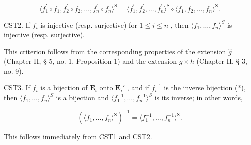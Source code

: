 \[
\langle f _ {1} ^ {\prime} \circ f _ {1}, f _ {2} ^ {\prime} \circ f _ {2}, \dots , f _ {n} ^ {\prime} \circ f _ {n} \rangle^ {\mathrm{S}} = \langle f _ {1} ^ {\prime}, f _ {2} ^ {\prime}, \dots , f _ {n} ^ {\prime} \rangle^ {\mathrm{S}} \circ \langle f _ {1}, f _ {2}, \dots , f _ {n} \rangle^ {\mathrm{S}}.
\]

CST2. If \(f_{i}\) is injective (resp. surjective) for \(1 \leqslant i \leqslant n\) , then \(\langle f_{1}, \ldots, f_{n} \rangle^{S}\) is injective (resp. surjective).

This criterion follows from the corresponding properties of the extension \(\hat{g}\) (Chapter II, § 5, no. 1, Proposition 1) and the extension \(g \times h\) (Chapter II, § 3, no. 9).

CST3. If \(f_{i}\) is a bijection of \(\mathbf{E}_i\) onto \(\mathbf{E}_i'\) , and if \(f_{i}^{-1}\) is the inverse bijection (*), then \(\langle f_1, \ldots, f_n \rangle^{S}\) is a bijection and \(\langle f_1^{-1}, \ldots, f_n^{-1} \rangle^{S}\) is its inverse; in other words,

\[
(\langle f _ {1}, \dots , f _ {n} \rangle^ {\mathrm{S}}) ^ {- 1} = \langle f _ {1} ^ {- 1}, \dots , f _ {n} ^ {- 1} \rangle^ {\mathrm{S}}.
\]

This follows immediately from CST1 and CST2.

